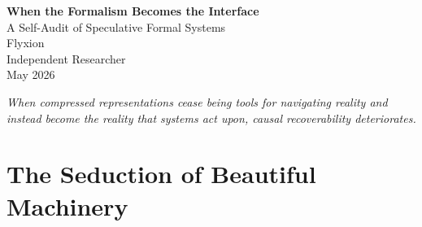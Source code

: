 \documentclass[12pt, a4paper]{article}
\begin{document}
\begin{titlepage}
\centering
\vspace*{3cm}
{\Large\bfseries When the Formalism Becomes the Interface}\\[1.2em]
{\large A Self-Audit of Speculative Formal Systems}\\[3em]
{\normalsize Flyxion}\\[0.5em]
{\normalsize Independent Researcher}\\[3em]
{\normalsize May 2026}
\vfill
\begin{abstract}
\noindent
Formal frameworks in speculative theoretical work face a distinctive failure mode: the internal elegance of a notation system can begin regulating admissible interpretation more strongly than contact with observation regulates the notation itself. When this occurs, the formalism has ceased to function as a tool for navigating reality and has become, instead, an interface through which reality is filtered and gradually displaced. The danger is not merely that a theory becomes incorrect, but that it becomes internally coherent in a way that obscures the loss of external constraint, allowing aesthetic continuity to masquerade as explanatory depth. Systems of notation, once sufficiently elaborate, can generate their own standards of intelligibility and begin stabilizing themselves against revision rather than remaining answerable to the phenomena they were built to describe.

This essay introduces an audit protocol for identifying when formal structure has crossed from necessary to aesthetic, examines several case studies drawn from my own framework development, and argues that a theory capable of recognizing this boundary in itself is in a more epistemically defensible position than one that cannot. The audit is not a demolition. It is a form of ongoing theoretical maintenance --- the condition under which a living research program remains distinct from a finalized doctrine.
\end{abstract}
\end{titlepage}


\newpage

\epigraph{\itshape When compressed representations cease being tools for navigating
reality and instead become the reality that systems act upon, causal
recoverability deteriorates.}{}


\section{The Seduction of Beautiful Machinery}
\end{document}
